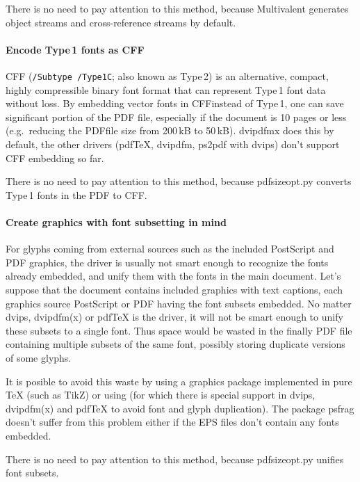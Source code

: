 \documentclass{ltugproc}
\def\cmd{\textsf}
\def\pkg{\textsf}
\begin{document}
There is no need to pay attention to this method, because
Multivalent generates object streams and cross-reference streams by default.

\paragraph{Encode Type\,1 fonts as CFF}

CFF \cite{cff} (\texttt{/Subtype /Type1C}; also known as Type\,2) 
is an alternative, compact, highly compressible binary font
format that can represent Type\,1 font data without loss. By embedding
vector fonts in CFFinstead of Type\,1, one can
save significant portion of the PDF file, especially if the document is 10
pages or less (e.g.\ reducing the PDFfile size from 200\,kB to 50\,kB).
\cmd{dvipdfmx} does this by default, the other drivers (pdf\TeX{},
\cmd{dvipdfm}, \cmd{ps2pdf} with \cmd{dvips}) don't support CFF embedding so
far.

There is no need to pay attention to this method, because
\cmd{pdfsizeopt.py} converts Type\,1 fonts in the PDF to CFF. 

\paragraph{Create graphics with font subsetting in mind}

For glyphs coming from external sources such as the included PostScript and
PDF graphics, the driver is usually not smart enough to recognize the fonts
already embedded, and unify them with the fonts in the main document. Let's
suppose that the document contains included graphics with text captions,
each graphics source PostScript or PDF having the font subsets embedded. No
matter \cmd{dvips}, \cmd{dvipdfm(x)} or pdf\TeX{} is the driver, it will not
be smart enough to unify these subsets to a single font. Thus space would be
wasted in the finally PDF file containing multiple subsets of the same font,
possibly storing duplicate versions of some glyphs.

It is posible to avoid this waste by using a graphics package implemented in
pure \TeX{} (such as TikZ) or using \MP{} (for which there is
special support in \cmd{dvips}, \cmd{dvipdfm(x)} and pdf\TeX{} to avoid font
and glyph duplication). The package \pkg{psfrag} doesn't suffer from this
problem either if the EPS files don't contain any fonts embedded.

There is no need to pay attention to this method, because
\cmd{pdfsizeopt.py} unifies font subsets.
\end{document}
